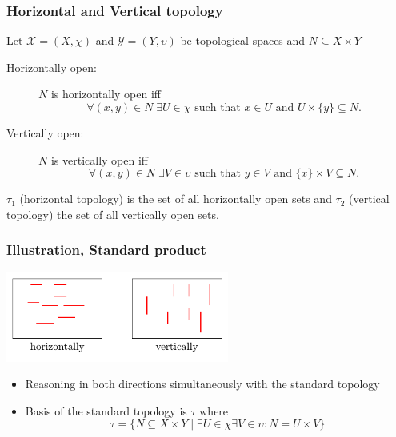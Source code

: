 \documentclass[hyperref={pdfpagelabels=false},t,10pt]{beamer}
\begin{document}
\begin{frame}
  \frametitle{Horizontal and Vertical topology}
  \begin{definition}
      Let \( \mathcal{X} = (X, \chi) \) and \( \mathcal{Y} = (Y, \upsilon) \) be topological spaces and \( N \subseteq X \times Y \) \newline

    \begin{description}
      \item[Horizontally open:] \(N\) is horizontally open iff 
      \[
        \forall (x, y) \in N\; \exists U \in \chi \text{ such that } x \in U \text{ and } U \times \{y\} \subseteq N.
      \]

      \item[Vertically open:] \(N\) is vertically open iff 
      \[
        \forall (x, y) \in N\; \exists V \in \upsilon \text{ such that } y \in V \text{ and } \{x\} \times V \subseteq N.
      \]

    \end{description}    
    $\tau_1$ (horizontal topology) is the set of all horizontally open sets and $\tau_2$ (vertical topology) the set of all vertically open sets.
  \end{definition}




\end{frame}

\begin{frame}
  \frametitle{Illustration, Standard product}
    \centering
    \includegraphics[width=0.55\textwidth]{Example4.pdf} \pause
  \begin{itemize}
    \item Reasoning in both directions simultaneously with the standard topology
    \item Basis of the standard topology is $\tau$ where 
    $$\tau = \{N \subseteq X \times Y \mid \exists U \in \chi \exists V \in \upsilon: N = U \times V\}$$  
  \end{itemize}

\end{frame}
\end{document}
